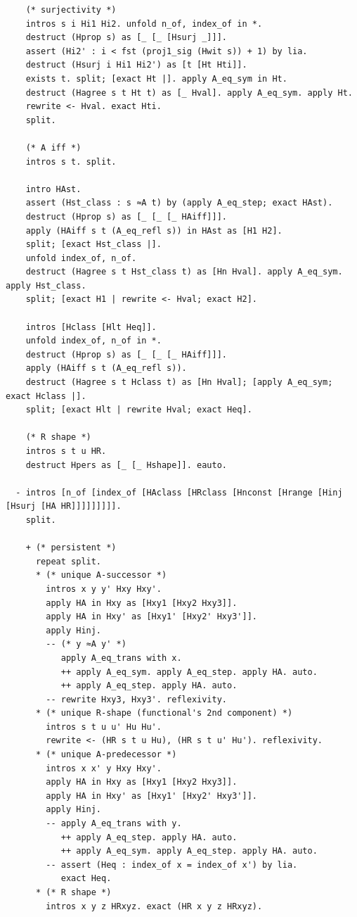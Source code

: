 \begin{latin}
\begin{verbatim}
    (* surjectivity *)
    intros s i Hi1 Hi2. unfold n_of, index_of in *.
    destruct (Hprop s) as [_ [_ [Hsurj _]]].
    assert (Hi2' : i < fst (proj1_sig (Hwit s)) + 1) by lia.
    destruct (Hsurj i Hi1 Hi2') as [t [Ht Hti]].
    exists t. split; [exact Ht |]. apply A_eq_sym in Ht.
    destruct (Hagree s t Ht t) as [_ Hval]. apply A_eq_sym. apply Ht.
    rewrite <- Hval. exact Hti.
    split.

    (* A iff *)
    intros s t. split.

    intro HAst.
    assert (Hst_class : s ≈A t) by (apply A_eq_step; exact HAst).
    destruct (Hprop s) as [_ [_ [_ HAiff]]].
    apply (HAiff s t (A_eq_refl s)) in HAst as [H1 H2].
    split; [exact Hst_class |].
    unfold index_of, n_of.
    destruct (Hagree s t Hst_class t) as [Hn Hval]. apply A_eq_sym. apply Hst_class.
    split; [exact H1 | rewrite <- Hval; exact H2].

    intros [Hclass [Hlt Heq]].
    unfold index_of, n_of in *.
    destruct (Hprop s) as [_ [_ [_ HAiff]]].
    apply (HAiff s t (A_eq_refl s)).
    destruct (Hagree s t Hclass t) as [Hn Hval]; [apply A_eq_sym; exact Hclass |].
    split; [exact Hlt | rewrite Hval; exact Heq].

    (* R shape *)
    intros s t u HR.
    destruct Hpers as [_ [_ Hshape]]. eauto.

  - intros [n_of [index_of [HAclass [HRclass [Hnconst [Hrange [Hinj [Hsurj [HA HR]]]]]]]]].
    split.

    + (* persistent *)
      repeat split.
      * (* unique A-successor *)
        intros x y y' Hxy Hxy'.
        apply HA in Hxy as [Hxy1 [Hxy2 Hxy3]].
        apply HA in Hxy' as [Hxy1' [Hxy2' Hxy3']].
        apply Hinj.
        -- (* y ≈A y' *)
           apply A_eq_trans with x.
           ++ apply A_eq_sym. apply A_eq_step. apply HA. auto.
           ++ apply A_eq_step. apply HA. auto.
        -- rewrite Hxy3, Hxy3'. reflexivity.
      * (* unique R-shape (functional's 2nd component) *)
        intros s t u u' Hu Hu'.
        rewrite <- (HR s t u Hu), (HR s t u' Hu'). reflexivity.
      * (* unique A-predecessor *)
        intros x x' y Hxy Hxy'.
        apply HA in Hxy as [Hxy1 [Hxy2 Hxy3]].
        apply HA in Hxy' as [Hxy1' [Hxy2' Hxy3']].
        apply Hinj.
        -- apply A_eq_trans with y.
           ++ apply A_eq_step. apply HA. auto.
           ++ apply A_eq_sym. apply A_eq_step. apply HA. auto.
        -- assert (Heq : index_of x = index_of x') by lia.
           exact Heq.
      * (* R shape *)
        intros x y z HRxyz. exact (HR x y z HRxyz).


\end{verbatim}
\end{latin}
